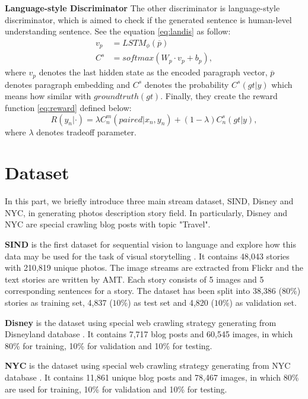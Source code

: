 \documentclass[11pt]{article}
\begin{document}
{\bf Language-style Discriminator} The other discriminator is language-style discriminator, which is aimed to check if the generated sentence is human-level understanding sentence. See the equation \ref{eq:landis} as follow:
\begin{equation}
\begin{aligned}
v_{p} &= LSTM_{\phi} (\overline{p}) \\
C^{s} &= softmax(W_{p} \cdot v_{p} + b_{p}),
\end{aligned}
\label{eq:landis}
\end{equation}
where $v_{p}$ denotes the last hidden state as the encoded paragraph vector, $\overline{p}$ denotes paragraph embedding and $C^{s}$ denotes the probability $C^{s}(gt|y)$ which means how similar with $ground truth(gt)$. Finally, they create the reward function \ref{eq:reward} defined below:
\begin{equation}
R(y_{n}|\cdot) = \lambda C_{n}^{m}(paired|x_n,y_n)+ (1 - \lambda) C_{n}^{s}(gt|y),
\label{eq:reward}
\end{equation}
where $\lambda$ denotes tradeoff parameter.

		
\section{Dataset}
In this part, we briefly introduce three main stream dataset, SIND, Disney and NYC, in generating photos description story field. In particularly, Disney and NYC are special crawling blog posts with topic "Travel". 

{\bf SIND} is the first dataset for sequential vision to language and explore how this data may be used for the task of visual storytelling \cite{huang2016visual}. It contains 48,043 stories with 210,819 unique photos. The image streams are extracted from Flickr and the text stories are written by AMT. Each story consists of 5 images and 5 corresponding sentences for a story. The dataset has been split into 38,386 ($80\%$) stories as training set, 4,837 ($10\%$) as test set and 4,820 ($10\%$) as validation set.

{\bf Disney}	 is the dataset using special web crawling strategy generating from Disneyland database \cite{gunhee-cvpr-15-text2pic}. It contains 7,717 blog posts and 60,545 images, in which 80\% for training, 10\% for validation
and 10\% for testing.

{\bf NYC} is the dataset using special web crawling strategy generating from NYC database \cite{gunhee-cvpr-15-text2pic}. It contains 11,861 unique blog posts and 78,467 images, in which 80\% are used for training, 10\% for validation and 10\% for testing.
	
\end{document}
